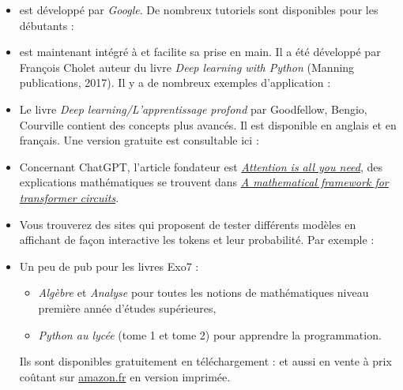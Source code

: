 \documentclass[11pt,class=report,crop=false]{standalone}
\begin{document}
\begin{itemize}
  \item \tensorflow{} est développé par \emph{Google}. De nombreux tutoriels sont disponibles pour les débutants :
  
  \item \keras{} est maintenant intégré à \tensorflow{} et facilite sa prise en main. 
  Il a été développé par François Cholet auteur du livre \emph{Deep learning with Python} (Manning publications, 2017). Il y a de nombreux exemples d'application :
  
  \item Le livre \emph{Deep learning/L'apprentissage profond} par Goodfellow, Bengio, Courville contient des concepts plus avancés. Il est disponible en anglais et en français. Une version gratuite est consultable ici :
  
  \item Concernant ChatGPT, l'article fondateur est 
  \href{https://arxiv.org/pdf/1706.03762.pdf}{\emph{Attention is all you need}}, des explications mathématiques se trouvent dans
  \href{https://transformer-circuits.pub/2021/framework/index.html}{\emph{A mathematical framework for transformer circuits}}.
  
  \item Vous trouverez des sites qui proposent de tester différents modèles en affichant de façon interactive les tokens et leur probabilité. Par exemple :
 
 
  
  \item Un peu de pub pour les livres Exo7 :  
  \begin{itemize}
    \item \emph{Algèbre} et \emph{Analyse} pour toutes les notions de mathématiques niveau première année d'études supérieures,
    \item \emph{Python au lycée} (tome 1 et tome 2) pour apprendre la programmation.
  \end{itemize}
  Ils sont disponibles gratuitement en téléchargement :
  et aussi en vente à prix coûtant sur \href{https://www.amazon.fr/}{amazon.fr} en version imprimée.
\end{itemize}
\end{document}
